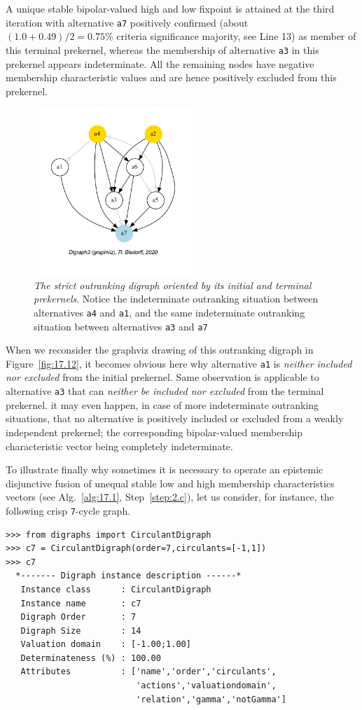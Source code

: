A unique stable bipolar-valued high and low fixpoint is attained at the third iteration with alternative \texttt{a7} positively confirmed (about $(1.0+0.49)/2 = 0.75\%$ criteria significance majority, see Line 13) as member of this terminal prekernel, whereas the membership of alternative \texttt{a3} in this prekernel appears indeterminate. All the remaining nodes have negative membership characteristic values and are hence positively excluded from this prekernel.
\begin{figure}[ht]
\sidecaption[t]
\includegraphics[width=6cm]{Figures/17-12-bestWorstOrientation.pdf}
\caption[The strict outranking digraph oriented by its initial and terminal prekernels]{\emph{The strict outranking digraph oriented by its initial and terminal prekernels}. Notice the indeterminate outranking situation between alternatives \texttt{a4} and \texttt{a1}, and the same indeterminate outranking situation between alternatives \texttt{a3} and \texttt{a7}}
\label{fig:17.12}       %
\end{figure}

When we reconsider the graphviz drawing of this outranking digraph in Figure~\vref{fig:17.12}, it becomes obvious here why alternative \texttt{a1} is \emph{neither included nor excluded} from the initial prekernel. Same observation is applicable to alternative \texttt{a3} that can \emph{neither be included nor excluded} from the terminal prekernel. it may even happen, in case of more indeterminate outranking situations, that no alternative  is positively included or excluded from a weakly independent prekernel; the corresponding bipolar-valued membership characteristic vector being completely indeterminate.

To illustrate finally why sometimes it is necessary to operate an epistemic disjunctive fusion of unequal stable low and high membership characteristics vectors (see Alg.~\vref{alg:17.1}, Step~\ref{step:2.c}), let us consider, for instance, the following crisp \texttt{7}-cycle graph.
\begin{lstlisting}
>>> from digraphs import CirculantDigraph
>>> c7 = CirculantDigraph(order=7,circulants=[-1,1])
>>> c7			     
  *------- Digraph instance description ------*
   Instance class      : CirculantDigraph
   Instance name       : c7
   Digraph Order       : 7
   Digraph Size        : 14
   Valuation domain    : [-1.00;1.00]
   Determinateness (%) : 100.00
   Attributes          : ['name','order','circulants',
                          'actions','valuationdomain',
                          'relation','gamma','notGamma']
\end{lstlisting}		       

